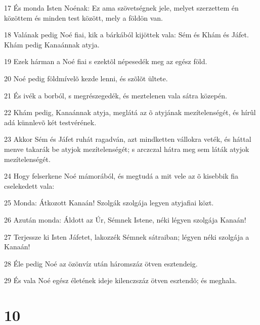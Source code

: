 \par 17 És monda Isten Noénak: Ez ama szövetségnek jele, melyet szerzettem én közöttem és minden test között, mely a földön van.
\par 18 Valának pedig Noé fiai, kik a bárkából kijöttek vala: Sém és Khám és Jáfet. Khám pedig Kanaánnak atyja.
\par 19 Ezek hárman a Noé fiai s ezektõl népesedék meg az egész föld.
\par 20 Noé pedig földmívelõ kezde lenni, és szõlõt ültete.
\par 21 És ivék a borból, s megrészegedék, és meztelenen vala sátra közepén.
\par 22 Khám pedig, Kanaánnak atyja, meglátá az õ atyjának mezítelenségét, és hírûl adá künnlevõ két testvérének.
\par 23 Akkor Sém és Jáfet ruhát ragadván, azt mindketten vállokra veték, és háttal menve takarák be atyjok mezítelenségét; s arczczal hátra meg sem láták atyjok mezítelenségét.
\par 24 Hogy felserkene Noé mámorából, és megtudá a mit vele az õ kisebbik fia cselekedett vala:
\par 25 Monda: Átkozott Kanaán! Szolgák szolgája legyen atyjafiai közt.
\par 26 Azután monda: Áldott az Úr, Sémnek Istene, néki légyen szolgája Kanaán!
\par 27 Terjessze ki Isten Jáfetet, lakozzék Sémnek sátraiban; légyen néki szolgája a Kanaán!
\par 28 Éle pedig Noé az özönvíz után háromszáz ötven esztendeig.
\par 29 És vala Noé egész életének ideje kilenczszáz ötven esztendõ; és meghala.

\chapter{10}

